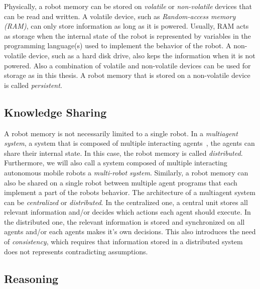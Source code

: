 Physically, a robot memory can be stored on \emph{volatile} or
\emph{non-volatile} devices that can be read and written. A volatile
device, such as \emph{Random-access memory (RAM)}, can only store
information as long as it is powered. Usually, RAM acts as storage
when the internal state of the robot is represented by variables in
the programming language(s) used to implement the behavior of the
robot.  A non-volatile device, such as a hard disk drive, also keps
the information when it is not powered. Also a combination of volatile
and non-volatile devices can be used for storage as in this thesis. A
robot memory that is stored on a non-volatile device is called
\emph{persistent}.

\subsection{Knowledge Sharing}
\label{sec:knowledge-sharing}
A robot memory is not necessarily limited to a single robot. In a
\emph{multiagent system}, a system that is composed of multiple
interacting agents~\cite{multiagentsystems}, the agents can share
their internal state. In this case, the robot memory is called
\emph{distributed}. Furthermore, we will also call a system composed
of multiple interacting autonomous mobile robots a \emph{multi-robot
  system}. Similarly, a robot memory can also be shared on a single
robot between multiple agent programs that each implement a part of
the robots behavior. The architecture of a multiagent system can be
\emph{centralized} or \emph{distributed}. In the centralized one,
a central unit stores all relevant information and/or decides which
actions each agent should execute. In the distributed one, the
relevant information is stored and synchronized on all agents and/or
each agents makes it's own decisions. This also introduces the need of
\emph{consistency}, which requires that information stored in a
distributed system does not represents contradicting assumptions.

\subsection{Reasoning}
\label{sec:reasoning}

